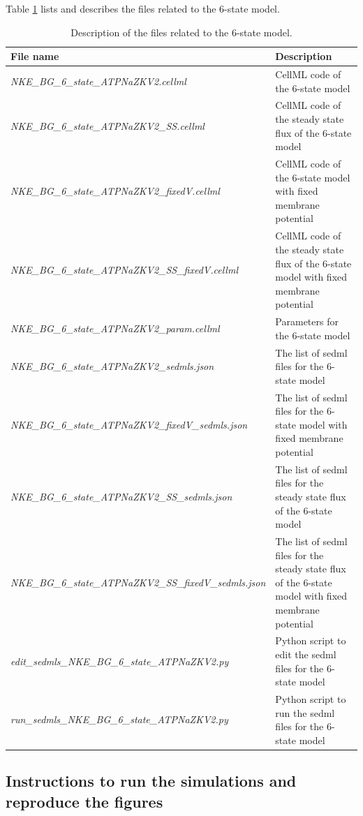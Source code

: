 \documentclass{biophys-new}
\begin{document}
Table \ref{tab:6state-files} lists and describes the files related to the 6-state model.
\begin{table}[!htbp]
\centering
\caption{Description of the files related to the 6-state model.}
\label{tab:6state-files}
\begin{tabularx}{\linewidth}{p{8cm} X }
\hline
File name & Description \\
\hline
\hline
\textit{NKE\_BG\_6\_state\_ATPNaZKV2.cellml} & CellML code of the 6-state model \\
\textit{NKE\_BG\_6\_state\_ATPNaZKV2\_SS.cellml} & CellML code of the steady state flux of the 6-state model \\
\textit{NKE\_BG\_6\_state\_ATPNaZKV2\_fixedV.cellml} & CellML code of the 6-state model with fixed membrane potential \\
\textit{NKE\_BG\_6\_state\_ATPNaZKV2\_SS\_fixedV.cellml} & CellML code of the steady state flux of the 6-state model with fixed membrane potential \\
\textit{NKE\_BG\_6\_state\_ATPNaZKV2\_param.cellml} & Parameters for the 6-state model \\
\textit{NKE\_BG\_6\_state\_ATPNaZKV2\_sedmls.json} & The list of sedml files for the 6-state model \\
\textit{NKE\_BG\_6\_state\_ATPNaZKV2\_fixedV\_sedmls.json} & The list of sedml files for the 6-state model with fixed membrane potential \\
\textit{NKE\_BG\_6\_state\_ATPNaZKV2\_SS\_sedmls.json} & The list of sedml files for the steady state flux of the 6-state model \\
\textit{NKE\_BG\_6\_state\_ATPNaZKV2\_SS\_fixedV\_sedmls.json} & The list of sedml files for the steady state flux of the 6-state model with fixed membrane potential \\
\textit{edit\_sedmls\_NKE\_BG\_6\_state\_ATPNaZKV2.py} & Python script to edit the sedml files for the 6-state model \\
\textit{run\_sedmls\_NKE\_BG\_6\_state\_ATPNaZKV2.py} & Python script to run the sedml files for the 6-state model \\
\hline
\end{tabularx}     
\end{table}

\subsection*{Instructions to run the simulations and reproduce the figures}
\end{document}
